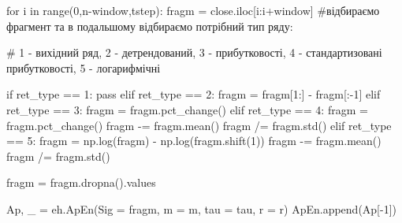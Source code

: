 \documentclass[
  letterpaper,
]{report}
\newenvironment{Shaded}{\begin{snugshade}}{\end{snugshade}}
\newcommand{\BuiltInTok}[1]{\textcolor[rgb]{0.00,0.23,0.31}{#1}}
\newcommand{\CommentTok}[1]{\textcolor[rgb]{0.37,0.37,0.37}{#1}}
\newcommand{\ControlFlowTok}[1]{\textcolor[rgb]{0.00,0.23,0.31}{#1}}
\newcommand{\DecValTok}[1]{\textcolor[rgb]{0.68,0.00,0.00}{#1}}
\newcommand{\KeywordTok}[1]{\textcolor[rgb]{0.00,0.23,0.31}{#1}}
\newcommand{\NormalTok}[1]{\textcolor[rgb]{0.00,0.23,0.31}{#1}}
\newcommand{\OperatorTok}[1]{\textcolor[rgb]{0.37,0.37,0.37}{#1}}
\begin{document}
\begin{Shaded}
\begin{Highlighting}[]
\ControlFlowTok{for}\NormalTok{ i }\KeywordTok{in} \BuiltInTok{range}\NormalTok{(}\DecValTok{0}\NormalTok{,n}\OperatorTok{{-}}\NormalTok{window,tstep):}
\NormalTok{    fragm }\OperatorTok{=}\NormalTok{ close.iloc[i:i}\OperatorTok{+}\NormalTok{window] }\CommentTok{\#відбираємо фрагмент та в подальшому відбираємо потрібний тип ряду:}
    
    \CommentTok{\# 1 {-} вихідний ряд, 2 {-} детрендований, 3 {-} прибутковості, 4 {-} стандартизовані прибутковості, 5 {-} логарифмічні}
    
    \ControlFlowTok{if}\NormalTok{ ret\_type }\OperatorTok{==} \DecValTok{1}\NormalTok{:}
        \ControlFlowTok{pass}
    \ControlFlowTok{elif}\NormalTok{ ret\_type }\OperatorTok{==} \DecValTok{2}\NormalTok{:}
\NormalTok{        fragm }\OperatorTok{=}\NormalTok{ fragm[}\DecValTok{1}\NormalTok{:] }\OperatorTok{{-}}\NormalTok{ fragm[:}\OperatorTok{{-}}\DecValTok{1}\NormalTok{]}
    \ControlFlowTok{elif}\NormalTok{ ret\_type }\OperatorTok{==} \DecValTok{3}\NormalTok{:}
\NormalTok{        fragm }\OperatorTok{=}\NormalTok{ fragm.pct\_change()}
    \ControlFlowTok{elif}\NormalTok{ ret\_type }\OperatorTok{==} \DecValTok{4}\NormalTok{:}
\NormalTok{        fragm }\OperatorTok{=}\NormalTok{ fragm.pct\_change()}
\NormalTok{        fragm }\OperatorTok{{-}=}\NormalTok{ fragm.mean()}
\NormalTok{        fragm }\OperatorTok{/=}\NormalTok{ fragm.std()}
    \ControlFlowTok{elif}\NormalTok{ ret\_type }\OperatorTok{==} \DecValTok{5}\NormalTok{:}
\NormalTok{        fragm }\OperatorTok{=}\NormalTok{ np.log(fragm) }\OperatorTok{{-}}\NormalTok{ np.log(fragm.shift(}\DecValTok{1}\NormalTok{))}
\NormalTok{        fragm }\OperatorTok{{-}=}\NormalTok{ fragm.mean()}
\NormalTok{        fragm }\OperatorTok{/=}\NormalTok{ fragm.std()}
        
\NormalTok{    fragm }\OperatorTok{=}\NormalTok{ fragm.dropna().values}
    
\NormalTok{    Ap, \_ }\OperatorTok{=}\NormalTok{ eh.ApEn(Sig }\OperatorTok{=}\NormalTok{ fragm, m }\OperatorTok{=}\NormalTok{ m, tau }\OperatorTok{=}\NormalTok{ tau, r }\OperatorTok{=}\NormalTok{ r)}
\NormalTok{    ApEn.append(Ap[}\OperatorTok{{-}}\DecValTok{1}\NormalTok{])}
\end{Highlighting}
\end{Shaded}
\end{document}
